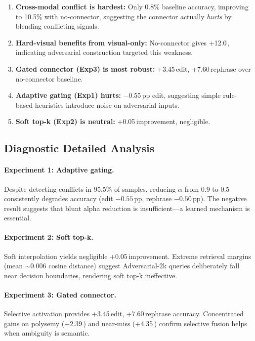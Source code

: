 \documentclass[11pt]{article}
\newcommand{\pp}{\,\text{pp}}
\begin{document}
\begin{enumerate}[leftmargin=*,itemsep=2pt]
  \item \textbf{Cross-modal conflict is hardest:} Only 0.8\% baseline accuracy,
    improving to 10.5\% with no-connector, suggesting the connector actually
    \emph{hurts} by blending conflicting signals.
  
  \item \textbf{Hard-visual benefits from visual-only:} No-connector gives
    +12.0\pp, indicating adversarial construction targeted this weakness.
  
  \item \textbf{Gated connector (Exp3) is most robust:} +3.45\pp edit,
    +7.60\pp rephrase over no-connector baseline.
  
  \item \textbf{Adaptive gating (Exp1) hurts:} $-0.55\pp$ edit, suggesting
    simple rule-based heuristics introduce noise on adversarial inputs.
  
  \item \textbf{Soft top-k (Exp2) is neutral:} +0.05\pp improvement, negligible.
\end{enumerate}

\subsection{Diagnostic Detailed Analysis}
\label{sec:diag_detail}

\paragraph{Experiment 1: Adaptive gating.}
Despite detecting conflicts in 95.5\% of samples, reducing $\alpha$ from 0.9
to 0.5 consistently degrades accuracy (edit $-0.55\pp$, rephrase $-0.50\pp$).
The negative result suggests that blunt alpha reduction is insufficient---a
learned mechanism is essential.

\paragraph{Experiment 2: Soft top-k.}
Soft interpolation yields negligible +0.05\pp improvement. Extreme retrieval
margins (mean $\sim$0.006 cosine distance) suggest Adversarial-2k queries
deliberately fall near decision boundaries, rendering soft top-k ineffective.

\paragraph{Experiment 3: Gated connector.}
Selective activation provides +3.45\pp edit, +7.60\pp rephrase accuracy.
Concentrated gains on polysemy (+2.39\pp) and near-miss (+4.35\pp) confirm
selective fusion helps when ambiguity is semantic.
\end{document}
